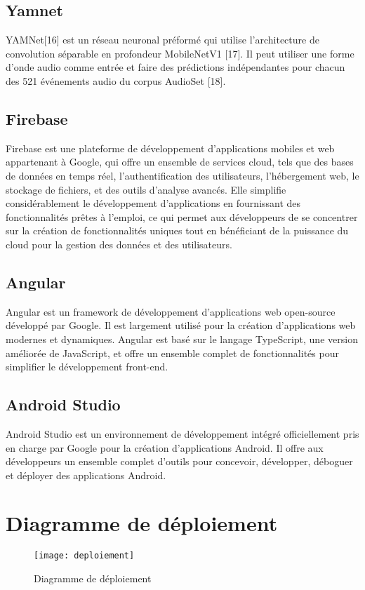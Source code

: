 \subsection{Yamnet}
YAMNet[16] est un réseau neuronal préformé qui utilise l'architecture de convolution séparable en profondeur MobileNetV1 [17]. Il peut utiliser une forme d'onde audio comme entrée et faire des prédictions indépendantes pour chacun des 521 événements audio du corpus AudioSet [18].

\subsection{Firebase}
Firebase est une plateforme de développement d'applications mobiles et web appartenant à Google, qui offre un ensemble de services cloud, tels que des bases de données en temps réel, l'authentification des utilisateurs, l'hébergement web, le stockage de fichiers, et des outils d'analyse avancés. Elle simplifie considérablement le développement d'applications en fournissant des fonctionnalités prêtes à l'emploi, ce qui permet aux développeurs de se concentrer sur la création de fonctionnalités uniques tout en bénéficiant de la puissance du cloud pour la gestion des données et des utilisateurs.

\subsection{Angular}
Angular est un framework de développement d'applications web open-source développé par Google. Il est largement utilisé pour la création d'applications web modernes et dynamiques. Angular est basé sur le langage TypeScript, une version améliorée de JavaScript, et offre un ensemble complet de fonctionnalités pour simplifier le développement front-end. 

\subsection{Android Studio}
Android Studio est un environnement de développement intégré officiellement pris en charge par Google pour la création d'applications Android. Il offre aux développeurs un ensemble complet d'outils pour concevoir, développer, déboguer et déployer des applications Android. 

\section{Diagramme de déploiement}
\begin{figure}[H]
	\centering
	\texttt{[image: deploiement]}
	\caption{Diagramme de déploiement}
\end{figure}

